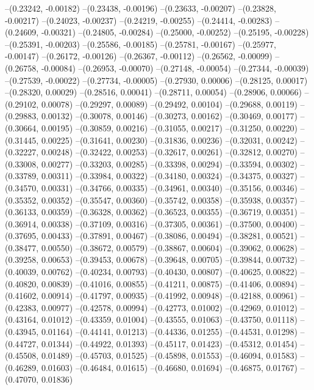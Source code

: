 --(0.23242, -0.00182)
--(0.23438, -0.00196)
--(0.23633, -0.00207)
--(0.23828, -0.00217)
--(0.24023, -0.00237)
--(0.24219, -0.00255)
--(0.24414, -0.00283)
--(0.24609, -0.00321)
--(0.24805, -0.00284)
--(0.25000, -0.00252)
--(0.25195, -0.00228)
--(0.25391, -0.00203)
--(0.25586, -0.00185)
--(0.25781, -0.00167)
--(0.25977, -0.00147)
--(0.26172, -0.00126)
--(0.26367, -0.00112)
--(0.26562, -0.00099)
--(0.26758, -0.00084)
--(0.26953, -0.00070)
--(0.27148, -0.00054)
--(0.27344, -0.00039)
--(0.27539, -0.00022)
--(0.27734, -0.00005)
--(0.27930, 0.00006)
--(0.28125, 0.00017)
--(0.28320, 0.00029)
--(0.28516, 0.00041)
--(0.28711, 0.00054)
--(0.28906, 0.00066)
--(0.29102, 0.00078)
--(0.29297, 0.00089)
--(0.29492, 0.00104)
--(0.29688, 0.00119)
--(0.29883, 0.00132)
--(0.30078, 0.00146)
--(0.30273, 0.00162)
--(0.30469, 0.00177)
--(0.30664, 0.00195)
--(0.30859, 0.00216)
--(0.31055, 0.00217)
--(0.31250, 0.00220)
--(0.31445, 0.00225)
--(0.31641, 0.00230)
--(0.31836, 0.00236)
--(0.32031, 0.00242)
--(0.32227, 0.00248)
--(0.32422, 0.00253)
--(0.32617, 0.00261)
--(0.32812, 0.00270)
--(0.33008, 0.00277)
--(0.33203, 0.00285)
--(0.33398, 0.00294)
--(0.33594, 0.00302)
--(0.33789, 0.00311)
--(0.33984, 0.00322)
--(0.34180, 0.00324)
--(0.34375, 0.00327)
--(0.34570, 0.00331)
--(0.34766, 0.00335)
--(0.34961, 0.00340)
--(0.35156, 0.00346)
--(0.35352, 0.00352)
--(0.35547, 0.00360)
--(0.35742, 0.00358)
--(0.35938, 0.00357)
--(0.36133, 0.00359)
--(0.36328, 0.00362)
--(0.36523, 0.00355)
--(0.36719, 0.00351)
--(0.36914, 0.00338)
--(0.37109, 0.00316)
--(0.37305, 0.00361)
--(0.37500, 0.00400)
--(0.37695, 0.00433)
--(0.37891, 0.00467)
--(0.38086, 0.00494)
--(0.38281, 0.00521)
--(0.38477, 0.00550)
--(0.38672, 0.00579)
--(0.38867, 0.00604)
--(0.39062, 0.00628)
--(0.39258, 0.00653)
--(0.39453, 0.00678)
--(0.39648, 0.00705)
--(0.39844, 0.00732)
--(0.40039, 0.00762)
--(0.40234, 0.00793)
--(0.40430, 0.00807)
--(0.40625, 0.00822)
--(0.40820, 0.00839)
--(0.41016, 0.00855)
--(0.41211, 0.00875)
--(0.41406, 0.00894)
--(0.41602, 0.00914)
--(0.41797, 0.00935)
--(0.41992, 0.00948)
--(0.42188, 0.00961)
--(0.42383, 0.00977)
--(0.42578, 0.00994)
--(0.42773, 0.01002)
--(0.42969, 0.01012)
--(0.43164, 0.01012)
--(0.43359, 0.01004)
--(0.43555, 0.01063)
--(0.43750, 0.01118)
--(0.43945, 0.01164)
--(0.44141, 0.01213)
--(0.44336, 0.01255)
--(0.44531, 0.01298)
--(0.44727, 0.01344)
--(0.44922, 0.01393)
--(0.45117, 0.01423)
--(0.45312, 0.01454)
--(0.45508, 0.01489)
--(0.45703, 0.01525)
--(0.45898, 0.01553)
--(0.46094, 0.01583)
--(0.46289, 0.01603)
--(0.46484, 0.01615)
--(0.46680, 0.01694)
--(0.46875, 0.01767)
--(0.47070, 0.01836)
